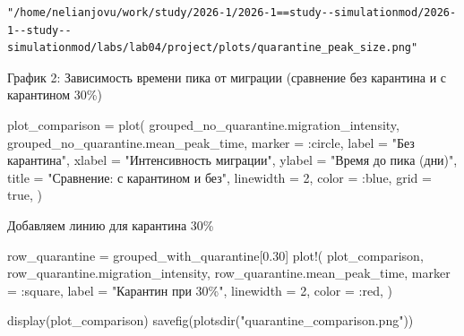 \documentclass[
  12pt,
  a4paper,
  DIV=11,
  numbers=noendperiod]{scrreprt}
\newenvironment{Shaded}{\begin{snugshade}}{\end{snugshade}}
\newcommand{\ConstantTok}[1]{\textcolor[rgb]{0.56,0.35,0.01}{#1}}
\newcommand{\FloatTok}[1]{\textcolor[rgb]{0.68,0.00,0.00}{#1}}
\newcommand{\FunctionTok}[1]{\textcolor[rgb]{0.28,0.35,0.67}{#1}}
\newcommand{\NormalTok}[1]{\textcolor[rgb]{0.00,0.23,0.31}{#1}}
\newcommand{\OperatorTok}[1]{\textcolor[rgb]{0.37,0.37,0.37}{#1}}
\newcommand{\StringTok}[1]{\textcolor[rgb]{0.13,0.47,0.30}{#1}}
\begin{document}


\begin{verbatim}
"/home/nelianjovu/work/study/2026-1/2026-1==study--simulationmod/2026-1--study--simulationmod/labs/lab04/project/plots/quarantine_peak_size.png"
\end{verbatim}

График 2: Зависимость времени пика от миграции (сравнение без карантина
и с карантином 30\%)

\begin{Shaded}
\begin{Highlighting}[]
\NormalTok{plot\_comparison }\OperatorTok{=} \FunctionTok{plot}\NormalTok{(}
\NormalTok{    grouped\_no\_quarantine.migration\_intensity,}
\NormalTok{    grouped\_no\_quarantine.mean\_peak\_time,}
\NormalTok{    marker }\OperatorTok{=} \OperatorTok{:}\NormalTok{circle,}
\NormalTok{    label }\OperatorTok{=} \StringTok{"Без карантина"}\NormalTok{,}
\NormalTok{    xlabel }\OperatorTok{=} \StringTok{"Интенсивность миграции"}\NormalTok{,}
\NormalTok{    ylabel }\OperatorTok{=} \StringTok{"Время до пика (дни)"}\NormalTok{,}
\NormalTok{    title }\OperatorTok{=} \StringTok{"Сравнение: с карантином и без"}\NormalTok{,}
\NormalTok{    linewidth }\OperatorTok{=} \FloatTok{2}\NormalTok{,}
\NormalTok{    color }\OperatorTok{=} \OperatorTok{:}\NormalTok{blue,}
\NormalTok{    grid }\OperatorTok{=} \ConstantTok{true}\NormalTok{,}
\NormalTok{)}
\end{Highlighting}
\end{Shaded}



Добавляем линию для карантина 30\%

\begin{Shaded}
\begin{Highlighting}[]
\NormalTok{row\_quarantine }\OperatorTok{=}\NormalTok{ grouped\_with\_quarantine[}\FloatTok{0.30}\NormalTok{]}
\FunctionTok{plot!}\NormalTok{(}
\NormalTok{    plot\_comparison,}
\NormalTok{    row\_quarantine.migration\_intensity,}
\NormalTok{    row\_quarantine.mean\_peak\_time,}
\NormalTok{    marker }\OperatorTok{=} \OperatorTok{:}\NormalTok{square,}
\NormalTok{    label }\OperatorTok{=} \StringTok{"Карантин при 30\%"}\NormalTok{,}
\NormalTok{    linewidth }\OperatorTok{=} \FloatTok{2}\NormalTok{,}
\NormalTok{    color }\OperatorTok{=} \OperatorTok{:}\NormalTok{red,}
\NormalTok{)}

\FunctionTok{display}\NormalTok{(plot\_comparison)}
\FunctionTok{savefig}\NormalTok{(}\FunctionTok{plotsdir}\NormalTok{(}\StringTok{"quarantine\_comparison.png"}\NormalTok{))}
\end{Highlighting}
\end{Shaded}
\end{document}
